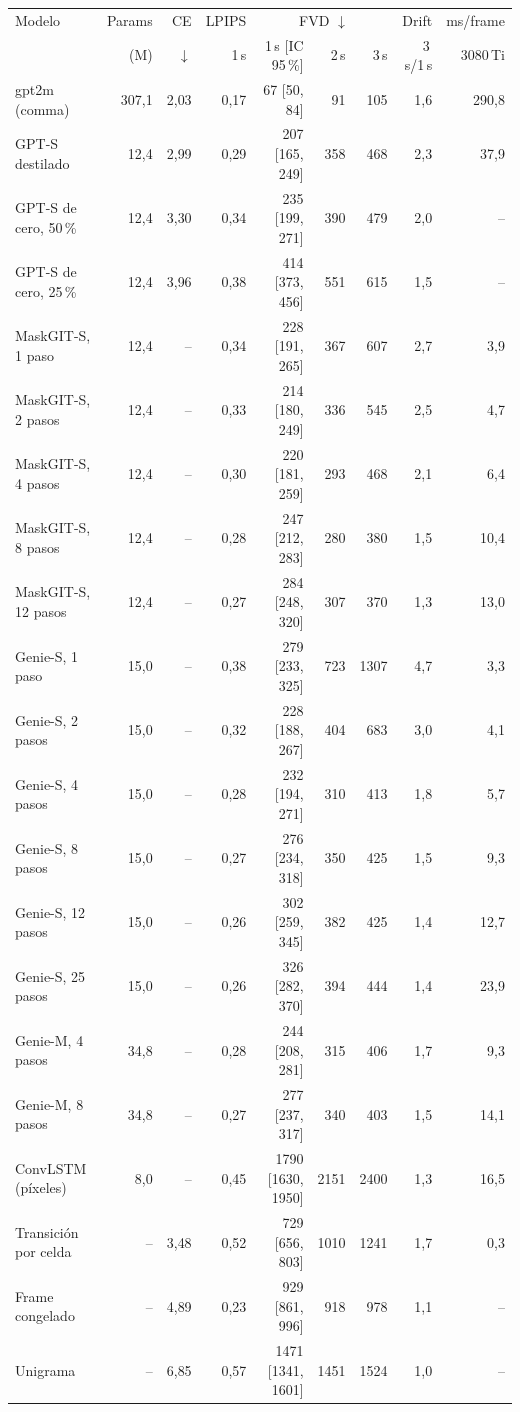 \begin{tabular}{lrrrrrrrr}
\toprule
Modelo & Params & CE & LPIPS & \multicolumn{3}{c}{FVD $\downarrow$} & Drift & ms/frame \\
\cmidrule(lr){5-7}
 & (M) & $\downarrow$ & 1\,s & 1\,s [IC 95\,\%] & 2\,s & 3\,s & 3\,s/1\,s & 3080\,Ti \\
\midrule
gpt2m (comma) & 307{,}1 & 2{,}03 & 0{,}17 & 67 [50, 84] & 91 & 105 & 1{,}6 & 290{,}8 \\
GPT-S destilado & 12{,}4 & 2{,}99 & 0{,}29 & 207 [165, 249] & 358 & 468 & 2{,}3 & 37{,}9 \\
GPT-S de cero, 50\,\% & 12{,}4 & 3{,}30 & 0{,}34 & 235 [199, 271] & 390 & 479 & 2{,}0 & -- \\
GPT-S de cero, 25\,\% & 12{,}4 & 3{,}96 & 0{,}38 & 414 [373, 456] & 551 & 615 & 1{,}5 & -- \\
MaskGIT-S, 1 paso & 12{,}4 & -- & 0{,}34 & 228 [191, 265] & 367 & 607 & 2{,}7 & 3{,}9 \\
MaskGIT-S, 2 pasos & 12{,}4 & -- & 0{,}33 & 214 [180, 249] & 336 & 545 & 2{,}5 & 4{,}7 \\
MaskGIT-S, 4 pasos & 12{,}4 & -- & 0{,}30 & 220 [181, 259] & 293 & 468 & 2{,}1 & 6{,}4 \\
MaskGIT-S, 8 pasos & 12{,}4 & -- & 0{,}28 & 247 [212, 283] & 280 & 380 & 1{,}5 & 10{,}4 \\
MaskGIT-S, 12 pasos & 12{,}4 & -- & 0{,}27 & 284 [248, 320] & 307 & 370 & 1{,}3 & 13{,}0 \\
Genie-S, 1 paso & 15{,}0 & -- & 0{,}38 & 279 [233, 325] & 723 & 1307 & 4{,}7 & 3{,}3 \\
Genie-S, 2 pasos & 15{,}0 & -- & 0{,}32 & 228 [188, 267] & 404 & 683 & 3{,}0 & 4{,}1 \\
Genie-S, 4 pasos & 15{,}0 & -- & 0{,}28 & 232 [194, 271] & 310 & 413 & 1{,}8 & 5{,}7 \\
Genie-S, 8 pasos & 15{,}0 & -- & 0{,}27 & 276 [234, 318] & 350 & 425 & 1{,}5 & 9{,}3 \\
Genie-S, 12 pasos & 15{,}0 & -- & 0{,}26 & 302 [259, 345] & 382 & 425 & 1{,}4 & 12{,}7 \\
Genie-S, 25 pasos & 15{,}0 & -- & 0{,}26 & 326 [282, 370] & 394 & 444 & 1{,}4 & 23{,}9 \\
Genie-M, 4 pasos & 34{,}8 & -- & 0{,}28 & 244 [208, 281] & 315 & 406 & 1{,}7 & 9{,}3 \\
Genie-M, 8 pasos & 34{,}8 & -- & 0{,}27 & 277 [237, 317] & 340 & 403 & 1{,}5 & 14{,}1 \\
ConvLSTM (píxeles) & 8{,}0 & -- & 0{,}45 & 1790 [1630, 1950] & 2151 & 2400 & 1{,}3 & 16{,}5 \\
Transición por celda & -- & 3{,}48 & 0{,}52 & 729 [656, 803] & 1010 & 1241 & 1{,}7 & 0{,}3 \\
Frame congelado & -- & 4{,}89 & 0{,}23 & 929 [861, 996] & 918 & 978 & 1{,}1 & -- \\
Unigrama & -- & 6{,}85 & 0{,}57 & 1471 [1341, 1601] & 1451 & 1524 & 1{,}0 & -- \\
\bottomrule
\end{tabular}
